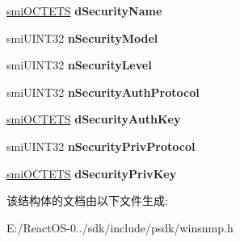 \begin{DoxyCompactItemize}
\item 
\mbox{\label{structsmi_c_o_n_t_e_x_t_i_n_f_o_a2334d14ffda1e4f3d6d4d84114999a57}} 
\hyperlink{structsmi_o_c_t_e_t_s}{smi\+O\+C\+T\+E\+TS} {\bfseries d\+Security\+Name}
\item 
\mbox{\label{structsmi_c_o_n_t_e_x_t_i_n_f_o_ae404159f216ac6b9462ed55465694d76}} 
smi\+U\+I\+N\+T32 {\bfseries n\+Security\+Model}
\item 
\mbox{\label{structsmi_c_o_n_t_e_x_t_i_n_f_o_ab5f6361923fba13b91a6d4afceea79cb}} 
smi\+U\+I\+N\+T32 {\bfseries n\+Security\+Level}
\item 
\mbox{\label{structsmi_c_o_n_t_e_x_t_i_n_f_o_af2d06215732dc9e341c7dcf61e4eab7b}} 
smi\+U\+I\+N\+T32 {\bfseries n\+Security\+Auth\+Protocol}
\item 
\mbox{\label{structsmi_c_o_n_t_e_x_t_i_n_f_o_aa2d6f1657236b1686bdb1fa8e8ba6110}} 
\hyperlink{structsmi_o_c_t_e_t_s}{smi\+O\+C\+T\+E\+TS} {\bfseries d\+Security\+Auth\+Key}
\item 
\mbox{\label{structsmi_c_o_n_t_e_x_t_i_n_f_o_ae971f0ea5bf3cc617030245fec92aee6}} 
smi\+U\+I\+N\+T32 {\bfseries n\+Security\+Priv\+Protocol}
\item 
\mbox{\label{structsmi_c_o_n_t_e_x_t_i_n_f_o_ab060ee4cacdfca47bab7232d5f0b1f00}} 
\hyperlink{structsmi_o_c_t_e_t_s}{smi\+O\+C\+T\+E\+TS} {\bfseries d\+Security\+Priv\+Key}
\end{DoxyCompactItemize}


该结构体的文档由以下文件生成\+:\begin{DoxyCompactItemize}
\item 
E\+:/\+React\+O\+S-\/0../sdk/include/psdk/winsnmp.\+h\end{DoxyCompactItemize}
